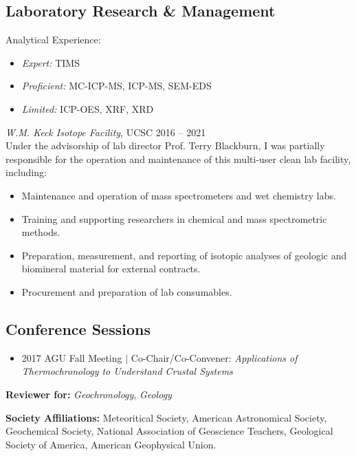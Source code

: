 \documentclass[10pt]{article}
\begin{document}
\subsection*{\textbf{Laboratory Research \& Management}}
Analytical Experience:
	\begin{itemize} [label={}]
		\item \textit{Expert:} TIMS
		\item \textit{Proficient:} MC-ICP-MS, ICP-MS, SEM-EDS
		\item \textit{Limited:} ICP-OES, XRF, XRD
	\end{itemize} \vspace{1ex}	
 \textit{W.M. Keck Isotope Facility}, UCSC \hfill 2016 -- 2021\\
Under the advisorship of lab director Prof. Terry Blackburn, I was partially responsible for the operation and maintenance of this multi-user clean lab facility, including:
	\begin{itemize} 
	\item Maintenance and operation of mass spectrometers and wet chemistry labs.
	\item Training and supporting researchers in chemical and mass spectrometric methods.
	\item Preparation, measurement, and reporting of isotopic analyses of geologic and biomineral material for external contracts.
	\item Procurement and preparation of lab consumables.
	\end{itemize}
	
\subsection*{\textbf{Conference Sessions}}
\begin{itemize}
	\item 2017 AGU Fall Meeting $|$ Co-Chair/Co-Convener: \textit{Applications of Thermochronology to Understand Crustal Systems}
\end{itemize}

\vspace{2ex}
\begin{hangparas}{5ex}{1}
	\textbf{Reviewer for:} \textit{Geochronology}, \textit{Geology}

	\vspace{2ex}
	\textbf{Society Affiliations:} Meteoritical Society, American Astronomical Society, Geochemical Society, National Association of Geoscience Teachers, Geological Society of America, American Geophysical Union.
\end{hangparas}
\end{document}
